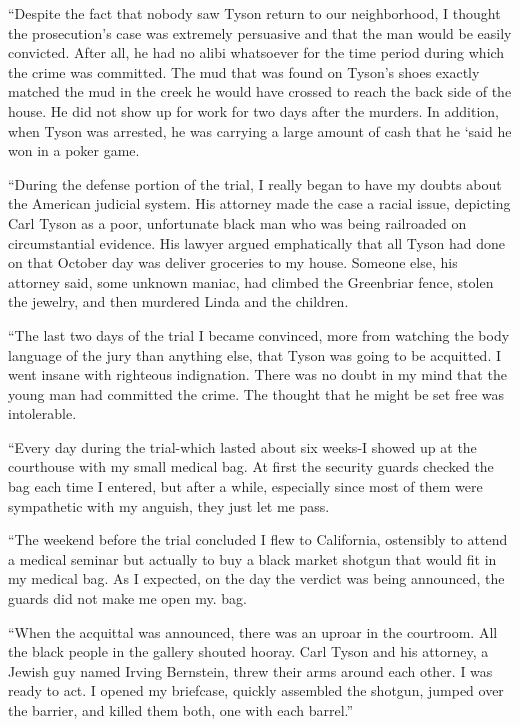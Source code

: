 \documentclass[]{article}
\begin{document}
{“Despite the fact that nobody saw Tyson return to our neighborhood, I thought the prosecution’s case was extremely persuasive and that the man would be easily convicted.  After all, he had no alibi whatsoever for the time period during which the crime was committed.  The mud that was found on Tyson’s shoes exactly matched the mud in the creek he would have crossed to reach the back side of the house.  He did not show up for work for two days after the murders.  In addition, when Tyson was arrested, he was carrying a large amount of cash that he ‘said he won in a poker game.

“During the defense portion of the trial, I really began to have my doubts about the American judicial system.  His attorney made the case a racial issue, depicting Carl Tyson as a poor, unfortunate black man who was being railroaded on circumstantial evidence.  His lawyer argued emphatically that all Tyson had done on that October day was deliver groceries to my house.  Someone else, his attorney said, some unknown maniac, had climbed the Greenbriar fence, stolen the jewelry, and then murdered Linda and the children.

“The last two days of the trial I became convinced, more from watching the body language of the jury than anything else, that Tyson was going to be acquitted.  I went insane with righteous indignation.  There was no doubt in my mind that the young man had committed the crime.  The thought that he might be set free was intolerable.

“Every day during the trial-which lasted about six weeks-I showed up at the courthouse with my small medical bag.  At first the security guards checked the bag each time I entered, but after a while, especially since most of them were sympathetic with my anguish, they just let me pass.

“The weekend before the trial concluded I flew to California, ostensibly to attend a medical seminar but actually to buy a black market shotgun that would fit in my medical bag.  As I expected, on the day the verdict was being announced, the guards did not make me open my.  bag.

“When the acquittal was announced, there was an uproar in the courtroom.  All the black people in the gallery shouted hooray.  Carl Tyson and his attorney, a Jewish guy named Irving Bernstein, threw their arms around each other.  I was ready to act.  I opened my briefcase, quickly assembled the shotgun, jumped over the barrier, and killed them both, one with each barrel.”

}
\end{document}
